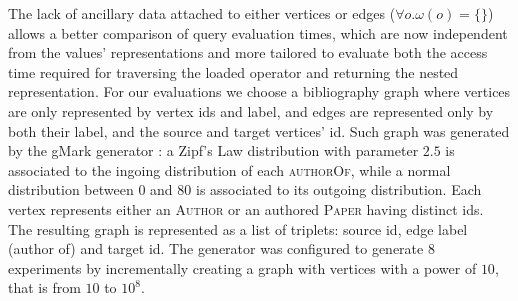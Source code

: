The lack of ancillary data attached to either vertices or edges ($\forall o. \omega(o)=\{\}$) allows a better comparison of query evaluation times, which are now independent from the values' representations and more tailored to evaluate both the  access time required for traversing the loaded operator and returning the nested representation.
For our evaluations we choose a bibliography graph where vertices are only represented by  vertex ids and  label, and edges are represented only by both their label, and the source and target vertices' id. Such graph was generated by the gMark generator \cite{BBCFLA17}: a Zipf's Law distribution with parameter $2.5$ is associated to the ingoing distribution  of each \textsc{authorOf}, while a normal distribution between $0$ and $80$ is associated to its outgoing distribution. Each vertex represents either an \textsc{Author} or an authored \textsc{Paper} having distinct ids. The resulting graph is represented as a list of triplets: source id, edge label (author of) and target id. The generator was configured to generate $8$ experiments by incrementally creating a graph with vertices with a power of $10$, that is from $10$ to $10^8$. 


